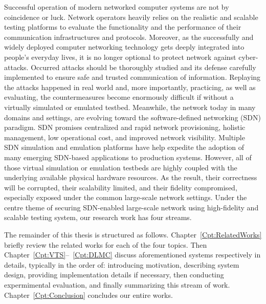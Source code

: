 
Successful operation of modern networked computer systems are not by coincidence or luck.
Network operators heavily relies on the realistic and scalable testing platforms to
evaluate the functionality and the performance of their communication infrastructures and protocols.
Moreover, as the successfully and widely deployed computer networking technology gets deeply integrated into people's everyday lives,
it is no longer optional to protect network against cyber-attacks.
Occurred attacks should be thoroughly studied and its defense carefully implemented to ensure safe and trusted communication of information.
Replaying the attacks happened in real world and, more importantly, practicing, as well as evaluating, the countermeasures become 
enormously difficult if without a virtually simulated or emulated testbed.
Meanwhile, the network today in many domains and settings, are evolving toward the software-defined networking (SDN) paradigm.
SDN promises centralized and rapid network provisioning, holistic management, low operational cost, and improved network visibility.
Multiple SDN simulation and emulation platforms have help expedite the adoption of many emerging SDN-based applications to production systems.
However, all of those virtual simulation or emulation testbeds are highly coupled with the underlying available physical hardware resources.
As the result, their correctness will be corrupted, their scalability limited, and their fidelity compromised,
especially exposed under the common large-scale network settings.
Under the centre theme of securing SDN-enabled large-scale network using high-fidelity and scalable testing system, our research work has four streams.






The remainder of this thesis is structured as follows.
Chapter~\ref{Cpt:RelatedWorks} briefly review the related works for each of the four topics.
Then Chapter~\ref{Cpt:VTS}--~\ref{Cpt:DLMC} discuss aforementioned systems respectively in details,
typically in the order of: introducing motivation, describing system design, providing implementation details if necessary,
then conducting expermimental evaluation, and finally summarizing this stream of work.
Chapter~\ref{Cpt:Conclusion} concludes our entire works.
